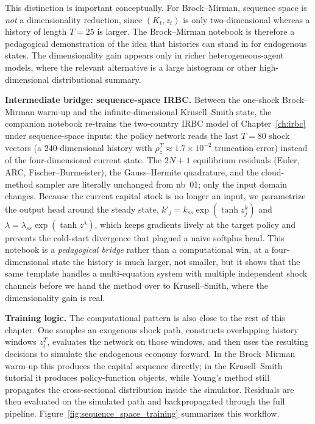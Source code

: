 \documentclass[11pt,a4paper]{report}
\begin{document}
\medskip
\noindent This distinction is important conceptually.  For Brock--Mirman, sequence space is \emph{not} a dimensionality reduction, since $(K_t, z_t)$ is only two-dimensional whereas a history of length $T=25$ is larger.  The Brock--Mirman notebook is therefore a pedagogical demonstration of the idea that histories can stand in for endogenous states.  The dimensionality gain appears only in richer heterogeneous-agent models, where the relevant alternative is a large histogram or other high-dimensional distributional summary.

\medskip
\noindent\textbf{Intermediate bridge: sequence-space IRBC.}  Between the one-shock Brock--Mirman warm-up and the infinite-dimensional Krusell--Smith state, the companion notebook  re-trains the two-country IRBC model of Chapter~\ref{ch:irbc} under sequence-space inputs: the policy network reads the last $T=80$ shock vectors (a $240$-dimensional history with $\rho_z^T \approx 1.7\times 10^{-2}$ truncation error) instead of the four-dimensional current state.  The $2N+1$ equilibrium residuals (Euler, ARC, Fischer--Burmeister), the Gauss--Hermite quadrature, and the cloud-method sampler are literally unchanged from nb~01; only the input domain changes.  Because the current capital stock is no longer an input, we parametrize the output head around the steady state, $k'_j = k_{ss}\exp(\tanh z^k_j)$ and $\lambda = \lambda_{ss}\exp(\tanh z^\lambda)$, which keeps gradients lively at the target policy and prevents the cold-start divergence that plagued a naive softplus head.  This notebook is a \emph{pedagogical bridge} rather than a computational win, at a four-dimensional state the history is much larger, not smaller, but it shows that the same template handles a multi-equation system with multiple independent shock channels before we hand the method over to Krusell--Smith, where the dimensionality gain is real.

\medskip\noindent\textbf{Training logic.}
The computational pattern is also close to the rest of this chapter.  One samples an exogenous shock path, constructs overlapping history windows $z_t^T$, evaluates the network on those windows, and then uses the resulting decisions to simulate the endogenous economy forward.  In the Brock--Mirman warm-up this produces the capital sequence directly; in the Krusell--Smith tutorial it produces policy-function objects, while Young's method still propagates the cross-sectional distribution inside the simulator.  Residuals are then evaluated on the simulated path and backpropagated through the full pipeline.  Figure~\ref{fig:sequence_space_training} summarizes this workflow.
\end{document}
